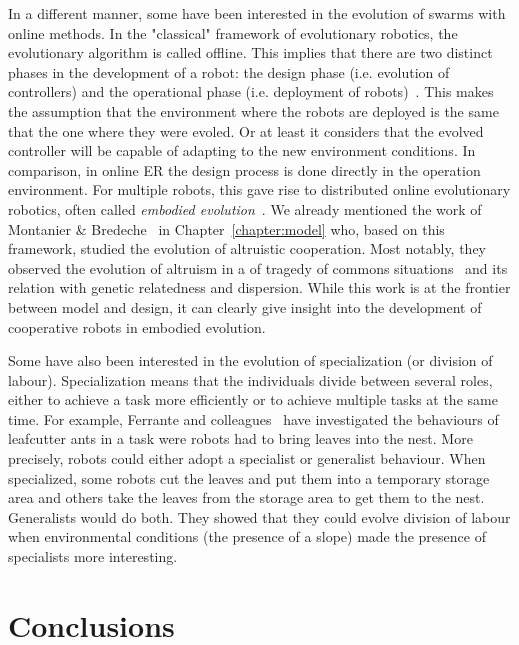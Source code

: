   In a different manner, some have been interested in the evolution of swarms with online methods. In the "classical" framework of evolutionary robotics, the evolutionary algorithm is called offline. This implies that there are two distinct phases in the development of a robot: the design phase (i.e. evolution of controllers) and the operational phase (i.e. deployment of robots)~\parencite{Doncieux2015a, Francesca2016}. This makes the assumption that the environment where the robots are deployed is the same that the one where they were evoled. Or at least it considers that the evolved controller will be capable of adapting to the new environment conditions. In comparison, in online ER the design process is done directly in the operation environment. For multiple robots, this gave rise to distributed online evolutionary robotics, often called \emph{embodied evolution}~\parencite{Ficici1999, Watson2002}. We already mentioned the work of Montanier \& Bredeche~\parencite{Montanier2011, Montanier2013} in Chapter~\ref{chapter:model} who, based on this framework, studied the evolution of altruistic cooperation. Most notably, they observed the evolution of altruism in a of tragedy of commons situations~\parencite{Hardin1968} and its relation with genetic relatedness and dispersion. While this work is at the frontier between model and design, it can clearly give insight into the development of cooperative robots in embodied evolution.

  Some have also been interested in the evolution of specialization (or division of labour). Specialization means that the individuals divide between several roles, either to achieve a task more efficiently or to achieve multiple tasks at the same time. For example, Ferrante and colleagues~\parencite{Ferrante2015} have investigated the behaviours of leafcutter ants in a task were robots had to bring leaves into the nest. More precisely, robots could either adopt a specialist or generalist behaviour. When specialized, some robots cut the leaves and put them into a temporary storage area and others take the leaves from the storage area to get them to the nest. Generalists would do both. They showed that they could evolve division of labour when environmental conditions (the presence of a slope) made the presence of specialists more interesting.


\section{Conclusions}

